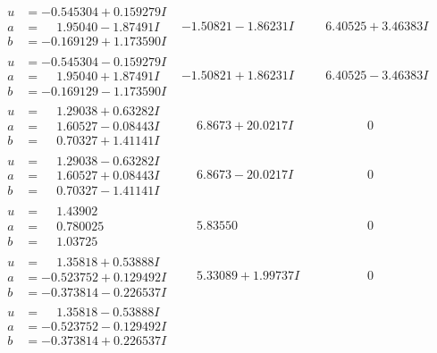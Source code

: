 \documentclass[1p]{elsarticle_modified}
\theoremstyle{definition}
\begin{document}
$$\begin{array}{c|c|c}
\begin{aligned}
u &= -0.545304 + 0.159279 I \\
a &= \phantom{-}1.95040 - 1.87491 I \\
b &= -0.169129 + 1.173590 I\end{aligned}
 & -1.50821 - 1.86231 I & \phantom{-}6.40525 + 3.46383 I \\ \hline\begin{aligned}
u &= -0.545304 - 0.159279 I \\
a &= \phantom{-}1.95040 + 1.87491 I \\
b &= -0.169129 - 1.173590 I\end{aligned}
 & -1.50821 + 1.86231 I & \phantom{-}6.40525 - 3.46383 I \\ \hline\begin{aligned}
u &= \phantom{-}1.29038 + 0.63282 I \\
a &= \phantom{-}1.60527 - 0.08443 I \\
b &= \phantom{-}0.70327 + 1.41141 I\end{aligned}
 & \phantom{-}6.8673 + 20.0217 I & \phantom{-0.000000 } 0 \\ \hline\begin{aligned}
u &= \phantom{-}1.29038 - 0.63282 I \\
a &= \phantom{-}1.60527 + 0.08443 I \\
b &= \phantom{-}0.70327 - 1.41141 I\end{aligned}
 & \phantom{-}6.8673 - 20.0217 I & \phantom{-0.000000 } 0 \\ \hline\begin{aligned}
u &= \phantom{-}1.43902\phantom{ +0.000000I} \\
a &= \phantom{-}0.780025\phantom{ +0.000000I} \\
b &= \phantom{-}1.03725\phantom{ +0.000000I}\end{aligned}
 & \phantom{-}5.83550\phantom{ +0.000000I} & \phantom{-0.000000 } 0 \\ \hline\begin{aligned}
u &= \phantom{-}1.35818 + 0.53888 I \\
a &= -0.523752 + 0.129492 I \\
b &= -0.373814 - 0.226537 I\end{aligned}
 & \phantom{-}5.33089 + 1.99737 I & \phantom{-0.000000 } 0 \\ \hline\begin{aligned}
u &= \phantom{-}1.35818 - 0.53888 I \\
a &= -0.523752 - 0.129492 I \\
b &= -0.373814 + 0.226537 I\end{aligned}

\end{array}$$
\end{document}
